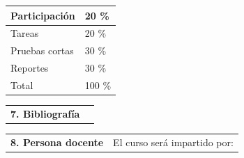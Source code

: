 \documentclass[letterpaper]{article}%
\begin{document}
\vspace*{2mm}%
\newline%
 \begin{minipage}{\linewidth}  \centering  \begin{tabular}{ p{4cm}  p{1.5cm} }  \toprule  Participación & 20 \% \\  \midrule  Tareas & 20 \% \\  \midrule  Pruebas cortas & 30 \% \\  \midrule  Reportes & 30 \% \\  \midrule Total & 100 \% \\  \bottomrule  \end{tabular} \end{minipage}%
\vspace*{4mm}%
\newline%
\begin{tabularx}{\textwidth}{p{3cm}p{13cm}}%
\par\fontsize{12}{14}\selectfont \textbf{\textcolor{parte}{7. Bibliografía}}&\nocite{ida2020sensors} \nocite{fraden2016sensors} \nocite{pallas2012sensors} \\%
\end{tabularx}%
\vspace*{-8mm}\printbibliography[heading=none]%
\begin{tabularx}{\textwidth}{p{3cm}p{13cm}}%
\par\fontsize{12}{14}\selectfont \textbf{\textcolor{parte}{8. Persona docente}}&El curso será impartido por:\\%
\end{tabularx}%
\end{document}
